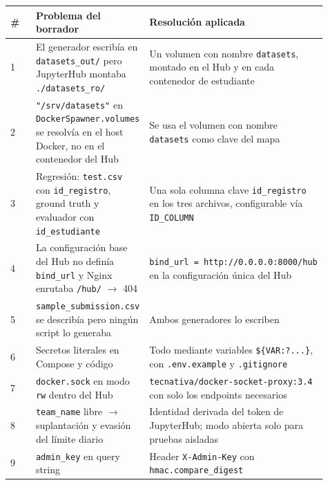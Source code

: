 \documentclass[11pt,a4paper]{article}
\begin{document}
\begin{longtable}[]{@{}p{0.302\linewidth}p{0.302\linewidth}p{0.302\linewidth}@{}}
\toprule
\# & Problema del borrador & Resolución aplicada \\
\midrule
\endhead
1 & El generador escribía en \texttt{datasets\_\allowbreak{}out/\allowbreak{}} pero JupyterHub montaba \texttt{.\allowbreak{}/\allowbreak{}datasets\_\allowbreak{}ro/\allowbreak{}} & Un volumen con nombre \texttt{datasets}, montado en el Hub y en cada contenedor de estudiante \\
2 & \texttt{"/\allowbreak{}srv/\allowbreak{}datasets"} en \texttt{DockerSpawner.\allowbreak{}volumes} se resolvía en el host Docker, no en el contenedor del Hub & Se usa el volumen con nombre \texttt{datasets} como clave del mapa \\
3 & Regresión: \texttt{test.\allowbreak{}csv} con \texttt{id\_\allowbreak{}registro}, ground truth y evaluador con \texttt{id\_\allowbreak{}estudiante} & Una sola columna clave \texttt{id\_\allowbreak{}registro} en los tres archivos, configurable vía \texttt{ID\_\allowbreak{}COLUMN} \\
4 & La configuración base del Hub no definía \texttt{bind\_\allowbreak{}url} y Nginx enrutaba \texttt{/\allowbreak{}hub/\allowbreak{}} \(\to\) 404 & \texttt{bind\_\allowbreak{}url\ =\ http:\allowbreak{}/\allowbreak{}/\allowbreak{}0.\allowbreak{}0.\allowbreak{}0.\allowbreak{}0:\allowbreak{}8000/\allowbreak{}hub} en la configuración única del Hub \\
5 & \texttt{sample\_\allowbreak{}submission.\allowbreak{}csv} se describía pero ningún script lo generaba & Ambos generadores lo escriben \\
6 & Secretos literales en Compose y código & Todo mediante variables \texttt{\$\{VAR:?...\}}, con \texttt{.\allowbreak{}env.\allowbreak{}example} y \texttt{.\allowbreak{}gitignore} \\
7 & \texttt{docker.\allowbreak{}sock} en modo \texttt{rw} dentro del Hub & \texttt{tecnativa/\allowbreak{}docker-\allowbreak{}socket-\allowbreak{}proxy:\allowbreak{}3.\allowbreak{}4} con solo los endpoints necesarios \\
8 & \texttt{team\_\allowbreak{}name} libre \(\to\) suplantación y evasión del límite diario & Identidad derivada del token de JupyterHub; modo abierta solo para pruebas aisladas \\
9 & \texttt{admin\_\allowbreak{}key} en query string & Header \texttt{X-\allowbreak{}Admin-\allowbreak{}Key} con \texttt{hmac.\allowbreak{}compare\_\allowbreak{}digest} \\

\end{longtable}
\end{document}
